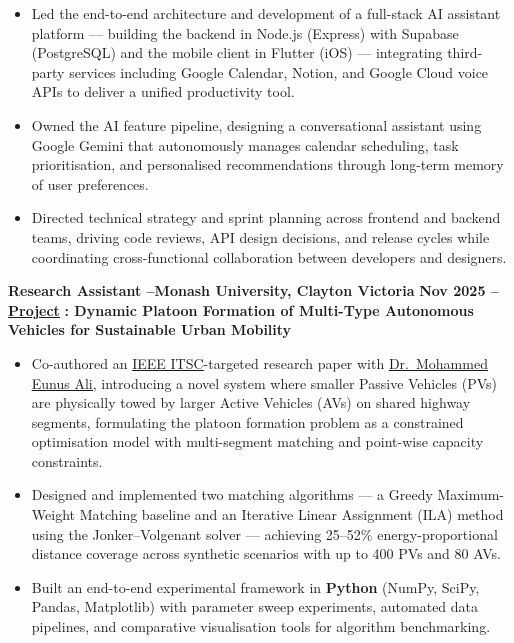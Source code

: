 \documentclass[11pt, a4paper]{article}
\let\hrefnoul\href
\renewcommand{\href}[2]{\hrefnoul{#1}{\ul{#2}}}
\begin{document}
\begin{itemize}[leftmargin=1.5em, itemsep=3pt, topsep=2pt, parsep=0pt]
  \item Led the end-to-end architecture and development of a full-stack AI assistant platform
        --- building the backend in Node.js (Express) with Supabase (PostgreSQL) and the mobile
        client in Flutter (iOS) --- integrating third-party services including Google Calendar,
        Notion, and Google Cloud voice APIs to deliver a unified productivity tool.

  \item Owned the AI feature pipeline, designing a conversational assistant using Google Gemini
        that autonomously manages calendar scheduling, task prioritisation, and personalised
        recommendations through long-term memory of user preferences.

  \item Directed technical strategy and sprint planning across frontend and backend teams,
        driving code reviews, API design decisions, and release cycles while coordinating
        cross-functional collaboration between developers and designers.
\end{itemize}

\vspace{4pt}
\noindent\textbf{Research Assistant –\quad Monash University, Clayton Victoria}%
\hfill\textbf{Nov 2025 –}\\
\href{https://supervisorconnect.it.monash.edu/projects/research/autonomous-vehicles-urban-transit-optimisation}{\textbf{Project}}%
\textbf{: Dynamic Platoon Formation of Multi-Type Autonomous Vehicles for Sustainable Urban Mobility}

\begin{itemize}[leftmargin=1.5em, itemsep=3pt, topsep=2pt, parsep=0pt]
  \item Co-authored an \href{https://ieee-itsc.org/2026/}{IEEE ITSC}-targeted research paper
        with \href{https://research.monash.edu/en/persons/eunus-ali}{Dr.~Mohammed Eunus Ali},
        introducing a novel system where smaller Passive Vehicles (PVs) are physically towed by
        larger Active Vehicles (AVs) on shared highway segments, formulating the platoon
        formation problem as a constrained optimisation model with multi-segment matching and
        point-wise capacity constraints.

  \item Designed and implemented two matching algorithms --- a Greedy Maximum-Weight Matching
        baseline and an Iterative Linear Assignment (ILA) method using the Jonker--Volgenant
        solver --- achieving 25--52\% energy-proportional distance coverage across synthetic
        scenarios with up to 400 PVs and 80 AVs.

  \item Built an end-to-end experimental framework in \textbf{Python} (NumPy, SciPy, Pandas,
        Matplotlib) with parameter sweep experiments, automated data pipelines, and comparative
        visualisation tools for algorithm benchmarking.
\end{itemize}
\end{document}
